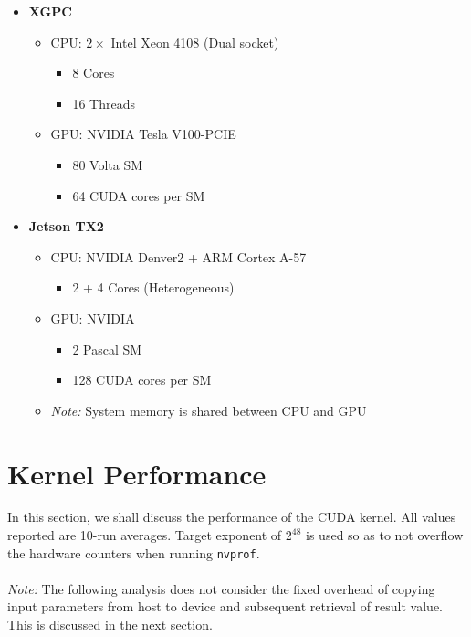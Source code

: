 \documentclass[a4paper,12pt]{article}
\begin{document}
\begin{itemize}
  \item \textbf{XGPC}
  \begin{itemize}
    \item CPU: $2 \times$ Intel Xeon 4108 (Dual socket)
    \begin{itemize}
      \item 8 Cores
      \item 16 Threads
    \end{itemize}
    \item GPU: NVIDIA Tesla V100-PCIE
    \begin{itemize}
      \item 80 Volta SM
      \item 64 CUDA cores per SM
    \end{itemize}
  \end{itemize}
  \item \textbf{Jetson TX2}
  \begin{itemize}
    \item CPU: NVIDIA Denver2 + ARM Cortex A-57
    \begin{itemize}
      \item 2 + 4 Cores (Heterogeneous)
    \end{itemize}
    \item GPU: NVIDIA
    \begin{itemize}
      \item 2 Pascal SM
      \item 128 CUDA cores per SM
    \end{itemize}
    \item \textit{Note:} System memory is shared between CPU and GPU
  \end{itemize}
\end{itemize}

\section{Kernel Performance}

In this section, we shall discuss the performance of the CUDA kernel. All values reported are 10-run averages. Target exponent of $2^{48}$ is used so as to not overflow the hardware counters when running \texttt{nvprof}.\\
\\
\textit{Note:} The following analysis does not consider the fixed overhead of copying input parameters from host to device and subsequent retrieval of result value. This is discussed in the next section.
\end{document}
